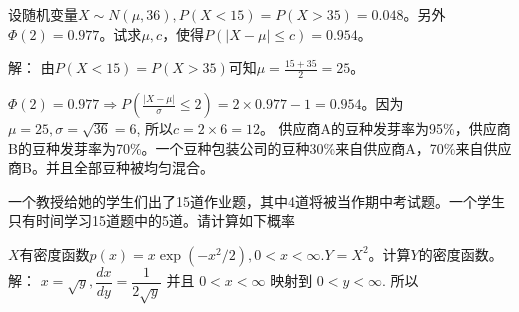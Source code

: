 \documentclass[10pt,addpoints,portrait]{exam}
\begin{document}
	\begin{questions} %
	\question[8]
	设随机变量$X\sim N(\mu, 36), P(X < 15) = P(X > 35) = 0.048$。另外$\Phi(2) = 0.977$。试求$\mu, c$，使得$P(|X - \mu| \leq c) = 0.954$。
	
	解：
	由$P(X < 15) = P(X > 35)$可知$\mu = \frac{15 + 35}{2} = 25$。
	
	$\Phi(2) = 0.977 \Rightarrow P(\frac{|X - \mu|}{\sigma} \leq 2) = 2 \times 0.977 - 1 = 0.954$。因为$\mu = 25, \sigma = \sqrt{36} = 6$, 所以$c = 2 \times 6 = 12$。
	\question
		供应商A的豆种发芽率为95\%，供应商B的豆种发芽率为70\%。一个豆种包装公司的豆种30\%来自供应商A，70\%来自供应商B。并且全部豆种被均匀混合。
		
	 	\question
	 	一个教授给她的学生们出了15道作业题，其中4道将被当作期中考试题。一个学生只有时间学习15道题中的5道。请计算如下概率
	 	\question[10]
	 	$X$有密度函数$p(x) = x\exp(-x ^ 2 / 2), 0 < x < \infty. Y = X ^ 2$。计算$Y$的密度函数。\\
	 	解：
	 	$x=\sqrt{y}, \dfrac{d x}{d y}=\dfrac{1}{2 \sqrt{y}}$ 并且 $0<x<\infty$ 映射到 $0<y<\infty$. 所以
	 	

\end{questions}
\end{document}
